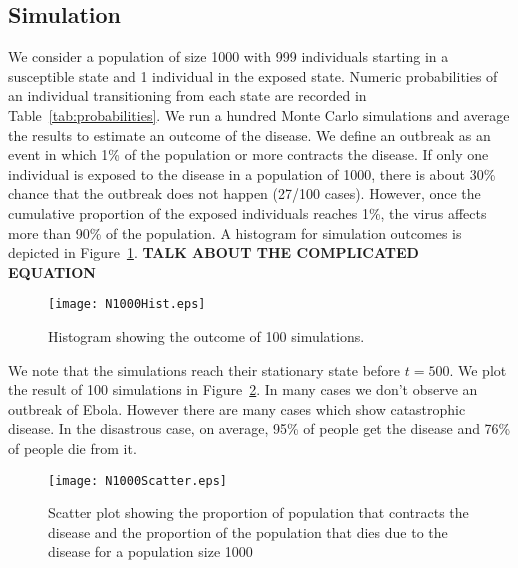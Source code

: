 \subsection{Simulation}
We consider a population of size 1000 with 999 individuals starting in a susceptible state and 1 individual in the exposed state. Numeric probabilities of an individual transitioning from each state are recorded in Table~\ref{tab:probabilities}. We run a hundred Monte Carlo simulations and average the results to estimate an outcome of the disease. We define an outbreak as an event in which 1\% of the population or more contracts the disease. If only one individual is exposed to the disease in a population of 1000, there is about 30\% chance that the outbreak does not happen (27/100 cases). However, once the cumulative proportion of the exposed individuals reaches 1\%, the virus affects more than 90\% of the population. A histogram for simulation outcomes is depicted in Figure~\ref{fig:Hist}.
%
%
%
%
%
%
\textbf{TALK ABOUT THE COMPLICATED EQUATION}
\begin{figure}
\begin{center}
\texttt{[image: N1000Hist.eps]}
\end{center}
\caption{Histogram showing the outcome of 100 simulations.}
\label{fig:Hist}
\end{figure}


We note that the simulations reach their stationary state before $t = 500$. We plot the result of 100 simulations in Figure~\ref{fig:Scatter}. In many cases we don't observe an outbreak of Ebola. However there are many cases which show catastrophic disease. In the disastrous case, on average, 95\% of people get the disease and 76\% of people die from it. 

 
\begin{figure}
\begin{center}
\texttt{[image: N1000Scatter.eps]}
\end{center}
\caption{Scatter plot showing the proportion of population that contracts the disease and the proportion of the population that dies due to the disease for a population size 1000}
\label{fig:Scatter}
\end{figure}


